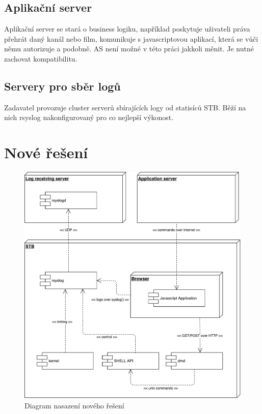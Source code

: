 \documentclass[thesis=B,czech]{FITthesis}[2012/06/26]
\begin{document}
\subsection{Aplikační server}
Aplikační server se stará o business logiku, například poskytuje uživateli práva přehrát daný kanál nebo film, komunikuje s javascriptovou aplikací, která se vůči němu autorizuje a podobně.
AS není možné v této práci jakkoli měnit. Je nutné zachovat kompatibilitu.

\subsection{Servery pro sběr logů}
Zadavatel provozuje cluster serverů sbírajících logy od statisíců STB. Běží na nich rsyslog nakonfigurovaný pro co nejlepší výkonost.

\section{Nové řešení}

\begin{figure}[ht]
	\centering
	\includegraphics[scale=0.5]{images/diagram-nasazeni-noveho-reseni}
	\caption[Diagram nasazení nového řešení]{Diagram nasazení nového řešení}
\end{figure}
\end{document}
